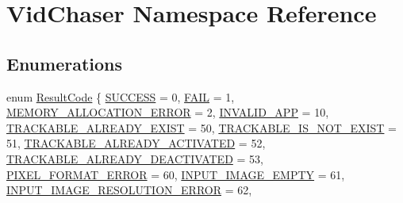 \hypertarget{namespace_vid_chaser}{}\section{Vid\+Chaser Namespace Reference}
\label{namespace_vid_chaser}
\subsection*{Enumerations}
\begin{DoxyCompactItemize}
\item 
enum \hyperlink{namespace_vid_chaser_a9a65fd4518380d53654f1af799cbf8ed}{Result\+Code} \{ \newline
\hyperlink{namespace_vid_chaser_a9a65fd4518380d53654f1af799cbf8eda5151e057ede3a1e7f376efbb56a0443e}{S\+U\+C\+C\+E\+SS} = 0, 
\hyperlink{namespace_vid_chaser_a9a65fd4518380d53654f1af799cbf8edab0d9537c24158b7ab8d23234c0808821}{F\+A\+IL} = 1, 
\hyperlink{namespace_vid_chaser_a9a65fd4518380d53654f1af799cbf8eda812155acd5fe876119863a7f884e7f4c}{M\+E\+M\+O\+R\+Y\+\_\+\+A\+L\+L\+O\+C\+A\+T\+I\+O\+N\+\_\+\+E\+R\+R\+OR} = 2, 
\hyperlink{namespace_vid_chaser_a9a65fd4518380d53654f1af799cbf8eda4d52f2f8000574e95b1ebc3dedc91298}{I\+N\+V\+A\+L\+I\+D\+\_\+\+A\+PP} = 10, 
\newline
\hyperlink{namespace_vid_chaser_a9a65fd4518380d53654f1af799cbf8edafd918f3fa6f9e5df38c8b0970dc0e51d}{T\+R\+A\+C\+K\+A\+B\+L\+E\+\_\+\+A\+L\+R\+E\+A\+D\+Y\+\_\+\+E\+X\+I\+ST} = 50, 
\hyperlink{namespace_vid_chaser_a9a65fd4518380d53654f1af799cbf8eda75a688e24ca224d5b9fe2859ea579f9c}{T\+R\+A\+C\+K\+A\+B\+L\+E\+\_\+\+I\+S\+\_\+\+N\+O\+T\+\_\+\+E\+X\+I\+ST} = 51, 
\hyperlink{namespace_vid_chaser_a9a65fd4518380d53654f1af799cbf8edafb2e81caca6ee6d10e83fb4a28921e39}{T\+R\+A\+C\+K\+A\+B\+L\+E\+\_\+\+A\+L\+R\+E\+A\+D\+Y\+\_\+\+A\+C\+T\+I\+V\+A\+T\+ED} = 52, 
\hyperlink{namespace_vid_chaser_a9a65fd4518380d53654f1af799cbf8eda2e2c5512767b66864b4db78ca8ab96ee}{T\+R\+A\+C\+K\+A\+B\+L\+E\+\_\+\+A\+L\+R\+E\+A\+D\+Y\+\_\+\+D\+E\+A\+C\+T\+I\+V\+A\+T\+ED} = 53, 
\newline
\hyperlink{namespace_vid_chaser_a9a65fd4518380d53654f1af799cbf8edac4e8d2fb08c509ce905b7821d8a028f1}{P\+I\+X\+E\+L\+\_\+\+F\+O\+R\+M\+A\+T\+\_\+\+E\+R\+R\+OR} = 60, 
\hyperlink{namespace_vid_chaser_a9a65fd4518380d53654f1af799cbf8edae75f339feb7a945186fcb40fc53280de}{I\+N\+P\+U\+T\+\_\+\+I\+M\+A\+G\+E\+\_\+\+E\+M\+P\+TY} = 61, 
\hyperlink{namespace_vid_chaser_a9a65fd4518380d53654f1af799cbf8eda40bd178f65d935a585199e4d178ebfe8}{I\+N\+P\+U\+T\+\_\+\+I\+M\+A\+G\+E\+\_\+\+R\+E\+S\+O\+L\+U\+T\+I\+O\+N\+\_\+\+E\+R\+R\+OR} = 62, 

\end{DoxyCompactItemize}
